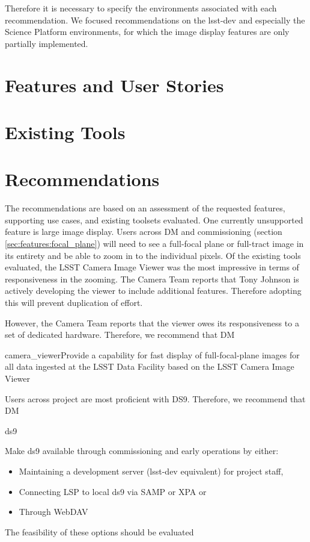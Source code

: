 \documentclass[DM,authoryear,toc]{lsstdoc}
\begin{document}
Therefore it is necessary to specify the environments associated with each recommendation.
We focused recommendations on the lsst-dev and especially the Science Platform environments, for which the image display features are only partially implemented.

\section{Features and User Stories}
\label{sec:features}


\section{Existing Tools}
\label{sec:tools}


\section{Recommendations}
\label{sec:conc}

The recommendations are based on an assessment of the requested features, supporting use cases, and existing toolsets evaluated.
One currently unsupported feature is large image display.
Users across DM and commissioning (section \ref{sec:features:focal_plane}) will need to see a full-focal plane or full-tract image in its entirety and be able to zoom in to the individual pixels.
Of the existing tools evaluated, the LSST Camera Image Viewer was the most impressive in terms of responsiveness in the zooming.
The Camera Team reports that Tony Johnson is actively developing the viewer to include additional features.
Therefore adopting this will prevent duplication of effort.

However, the Camera Team reports that the viewer owes its responsiveness to a set of dedicated hardware.
Therefore, we recommend that DM
\begin{recommendation}{camera_viewer}{Provide a capability for fast display of full-focal-plane images for all data ingested at the LSST Data Facility based on the LSST Camera Image Viewer}
\end{recommendation}

Users across project are most proficient with DS9. Therefore, we recommend that DM

\begin{recommendation}{ds9}{Make ds9 available through commissioning and early operations by either:
\begin{itemize}
\item{Maintaining a development server (lsst-dev equivalent) for project staff,}
\item{Connecting LSP to local ds9 via SAMP or XPA or}
\item{Through WebDAV}
\end{itemize}}
The feasibility of these options should be evaluated
\end{recommendation}
\end{document}
